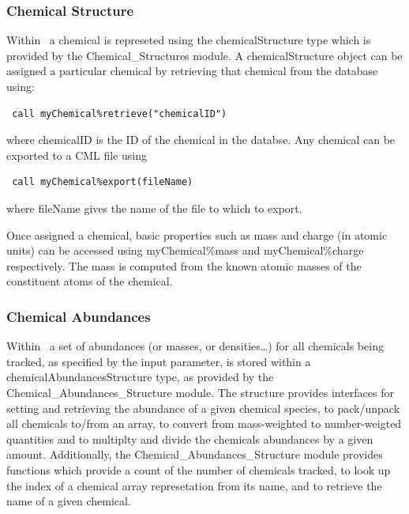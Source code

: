 \subsubsection{Chemical Structure}

Within \glc\ a chemical is represeted using the {\normalfont \ttfamily chemicalStructure} type which is provided by the {\normalfont \ttfamily Chemical\_Structures} module. A {\normalfont \ttfamily chemicalStructure} object can be assigned a particular chemical by retrieving that chemical from the database using:
\begin{verbatim}
 call myChemical%retrieve("chemicalID")
\end{verbatim}
where {\normalfont \ttfamily chemicalID} is the ID of the chemical in the databse. Any chemical can be exported to a CML file using
\begin{verbatim}
 call myChemical%export(fileName)
\end{verbatim}
where {\normalfont \ttfamily fileName} gives the name of the file to which to export.

Once assigned a chemical, basic properties such as mass and charge (in atomic units) can be accessed using {\normalfont \ttfamily myChemical\%mass} and {\normalfont \ttfamily myChemical\%charge} respectively. The mass is computed from the known atomic masses of the constituent atoms of the chemical.

\subsubsection{Chemical Abundances}

Within \glc\ a set of abundances (or masses, or densities\ldots) for all chemicals being tracked, as specified by the {\normalfont \ttfamily [chemicalsToTrack]} input parameter, is stored within a {\normalfont \ttfamily chemicalAbundancesStructure} type, as provided by the {\normalfont \ttfamily Chemical\_Abundances\_Structure} module. The structure provides interfaces for setting and retrieving the abundance of a given chemical species, to pack/unpack all chemicals to/from an array, to convert from mass-weighted to number-weigted quantities and to multiplty and divide the chemicals abundances by a given amount. Additionally, the {\normalfont \ttfamily Chemical\_Abundances\_Structure} module provides functions which provide a count of the number of chemicals tracked, to look up the index of a chemical array represetation from its name, and to retrieve the name of a given chemical.

